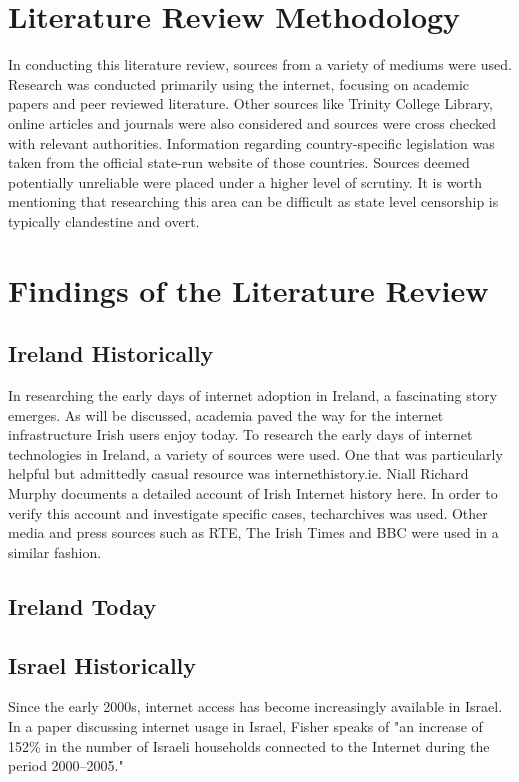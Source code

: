 \section{Literature Review Methodology}

In conducting this literature review, sources from a variety of mediums were used. Research was conducted primarily using the internet, focusing on academic papers and peer reviewed literature. Other sources like Trinity College Library, online articles and journals were also considered and sources were cross checked with relevant authorities. Information regarding country-specific legislation was taken from the official state-run website of those countries. Sources deemed potentially unreliable were placed under a higher level of scrutiny. It is worth mentioning that researching this area can be difficult as state level censorship is typically clandestine and overt. 



\section{Findings of the Literature Review}
\subsection{Ireland Historically }
In researching the early days of internet adoption in Ireland, a fascinating story emerges. As will be discussed, academia paved the way for the internet infrastructure Irish users enjoy today. To research the early days of internet technologies in Ireland, a variety of sources were used. One that was particularly helpful but admittedly casual resource was internethistory.ie. \cite{InternetHistoryIE} Niall Richard Murphy documents a detailed account of Irish Internet history here. In order to verify this account and investigate specific cases, techarchives \cite{TechArchivesIE} was used. Other media and press sources such as RTE, The Irish Times and BBC were used in a similar fashion.


\subsection{Ireland Today}





\subsection{Israel Historically}
Since the early 2000s, internet access has become increasingly available in Israel. In a paper discussing internet usage in Israel, Fisher speaks of "an increase of 152\% in the number of Israeli households connected to the Internet during the period 2000–2005." \cite{FISHER2006984} 

